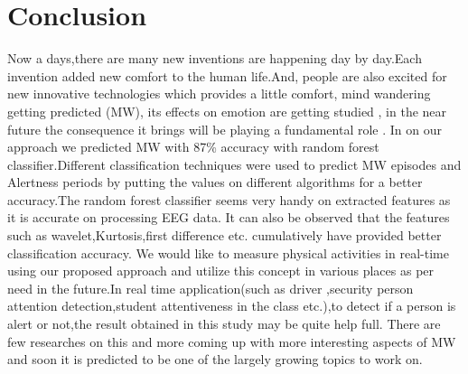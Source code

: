 
\chapter{Conclusion} %

\label{Chapter7} %


Now a days,there are many new inventions are happening day by day.Each invention added new comfort to the human life.And, people are also excited for new innovative technologies which provides a little comfort, mind wandering getting predicted  (MW), its effects on emotion are getting studied , in the near future the consequence it brings will be playing a fundamental role . In on our approach we predicted MW with 87\% accuracy with random forest classifier.Different classification techniques were used to predict MW episodes and Alertness periods by putting the values on different algorithms for a better accuracy.The  random forest classifier seems very handy on extracted features as it is accurate on processing EEG data. It can also be observed that the features such as wavelet,Kurtosis,first difference etc. cumulatively have provided better classification accuracy. We would like to measure physical activities in real-time using our proposed approach and utilize this concept in various places as per need in the future.In real time application(such as driver ,security person attention detection,student attentiveness in the class etc.),to detect if a person is alert or not,the result obtained in this study may be quite help full. There are few researches on this and more coming up with more interesting aspects of MW and soon it is predicted to be one of the largely growing topics to work on.